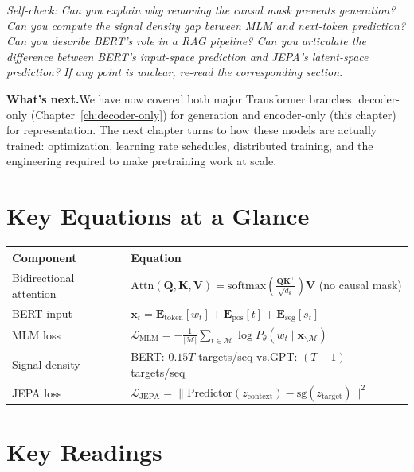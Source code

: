 \medskip
\noindent\textit{Self-check: Can you explain why removing the causal mask prevents generation? Can you compute the signal density gap between MLM and next-token prediction? Can you describe BERT's role in a RAG pipeline? Can you articulate the difference between BERT's input-space prediction and JEPA's latent-space prediction? If any point is unclear, re-read the corresponding section.}

\medskip
\noindent\textbf{What's next.}\quad We have now covered both major Transformer branches: decoder-only (Chapter~\ref{ch:decoder-only}) for generation and encoder-only (this chapter) for representation. The next chapter turns to how these models are actually trained: optimization, learning rate schedules, distributed training, and the engineering required to make pretraining work at scale.


\section*{Key Equations at a Glance}

\begin{center}
\renewcommand{\arraystretch}{1.6}
\begin{tabularx}{\textwidth}{@{}lX@{}}
\toprule
Component & Equation \\
\midrule
Bidirectional attention & $\text{Attn}(\mathbf{Q}, \mathbf{K}, \mathbf{V}) = \text{softmax}\!\left(\frac{\mathbf{Q}\mathbf{K}^\top}{\sqrt{d_k}}\right)\mathbf{V}$ \quad (no causal mask) \\[4pt]
BERT input & $\mathbf{x}_t = \mathbf{E}_\text{token}[w_t] + \mathbf{E}_\text{pos}[t] + \mathbf{E}_\text{seg}[s_t]$ \\[4pt]
MLM loss & $\mathcal{L}_\text{MLM} = -\frac{1}{|\mathcal{M}|}\sum_{t \in \mathcal{M}} \log P_\theta(w_t \mid \mathbf{x}_{\backslash \mathcal{M}})$ \\[4pt]
Signal density & BERT: $0.15T$ targets/seq \quad vs.\quad GPT: $(T-1)$ targets/seq \\[4pt]
JEPA loss & $\mathcal{L}_\text{JEPA} = \| \text{Predictor}(z_\text{context}) - \text{sg}(z_\text{target}) \|^2$ \\
\bottomrule
\end{tabularx}
\end{center}


\section*{Key Readings}

